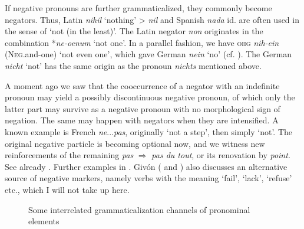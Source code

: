 If negative pronouns are further grammaticalized, they commonly become negators. Thus, Latin \textit{nihil} ‘nothing’ {\textgreater} \textit{nil} and Spanish \textit{nada} id. are often used in the sense of ‘not (in the least)’. The Latin negator \textit{non} originates in the combination *\textit{ne-oenum} ‘not one’. In a parallel fashion, we have \textsc{ohg} \textit{nih-ein} (\textsc{Neg}.and-one) ‘not even one’, which gave German \textit{nein} ‘no’ (cf. \citealt[140]{Meillet1912}). The German \textit{nicht} ‘not’ has the same origin as the pronoun \textit{nichts} mentioned above.

A moment ago we saw that the cooccurrence of a negator with an indefinite pronoun may yield a possibly discontinuous negative pronoun, of which only the latter part may survive as a negative pronoun with no morphological sign of negation. The same may happen with negators when they are intensified. A known example is French \textit{ne}...\textit{pas}, originally ‘not a step’, then simply ‘not’. The original negative particle is becoming optional now, and we witness new reinforcements of the remaining \textit{pas} $\Rightarrow $ \textit{pas du tout}, or its renovation by \textit{point}. See already \citealt[140]{Meillet1912}. Further examples in \citealt[204]{Givón1979a}. Givón (\citeyear[204]{Givón1979a} and \citeyear[917]{Givón1973}) also discusses an alternative source of negative markers, namely verbs with the meaning ‘fail’, ‘lack’, ‘refuse’ etc., which I will not take up here.


\begin{figure}
	\caption{Some interrelated grammaticalization channels of pronominal elements} \label{interrelatedpronomel}
\end{figure}

